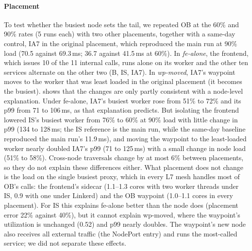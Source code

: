 \paragraph{Placement}
To test whether the busiest node sets the tail, we repeated OB at the 60\% and
90\% rates (5 runs each) with two other placements, together with a same-day
control, IA7 in the original placement, which reproduced the main run at 90\% load (70.5
against 69.3\,ms; 36.7 against 41.5\,ms at 60\%). In \emph{fe-alone}, the frontend, which issues
10 of the 11 internal calls, runs alone on its worker and the other ten
services alternate on the other two (B, IS, IA7). In \emph{wp-moved}, IA7's
waypoint moves to the worker that was least loaded in the original placement
(it becomes the busiest).  shows that
the changes are only partly consistent with a node-level explanation. Under
fe-alone, IA7's busiest worker rose from 51\% to 72\% and its p99 from 71 to
106\,ms, as that explanation predicts. But isolating the frontend lowered
IS's busiest worker from 76\% to 60\% at 90\% load with little change in
p99 (134 to 128\,ms; the IS reference is the main run, while the same-day
baseline reproduced the main run's 11.9\,ms), and moving the waypoint to the
least-loaded worker nearly doubled IA7's p99 (71 to 125\,ms) with a small
change in node load (51\% to 58\%). Cross-node traversals change by at most 6\% between
placements, so they do not explain these differences either. What placement
does not change is the load on the single busiest proxy, which in every L7
mesh handles most of OB's calls: the frontend's sidecar (1.1--1.3 cores with
two worker threads under IS, 0.9 with one under Linkerd) and the OB waypoint
(1.0--1.1 cores in every placement). For IS this explains fe-alone better than
the node does (placement error 22\% against 40\%), but it cannot explain
wp-moved, where the waypoint's utilization is unchanged (0.52) and p99 nearly
doubles. The waypoint's new node also receives all external traffic (the
NodePort entry) and runs the most-called service; we did not separate these
effects.

